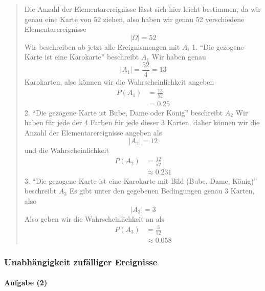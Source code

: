 \documentclass[
]{article}
\begin{document}
\begin{quote}
Die Anzahl der Elementarereignisse lässt sich hier leicht bestimmen, da
wir genau eine Karte von 52 ziehen, also haben wir genau 52 verschiedene
Elementarereignisse \[\lvert \Omega \rvert = 52 \] Wir beschreiben ab
jetzt alle Ereignismengen mit \(A_i\) 1. ``Die gezogene Karte ist eine
Karokarte'' beschreibt \(A_1\) Wir haben genau
\[\lvert A_{1} \rvert = \frac{52}{4} = 13\] Karokarten, also können wir
die Wahrscheinlichkeit angeben \[\begin{align}
P(A_{1}) &= \frac{13}{52}  \\
&= 0.25
\end{align}\] 2. ``Die gezogene Karte ist Bube, Dame oder König''
beschreibt \(A_2\) Wir haben für jede der 4 Farben für jede dieser 3
Karten, daher können wir die Anzahl der Elementarereignisse angeben als
\[\lvert A_{2} \rvert  = 12\] und die Wahrscheinlichkeit \[\begin{align}
P(A_{2}) &= \frac{12}{52}  \\
&\approx 0.231
\end{align}\] 3. ``Die gezogene Karte ist eine Karokarte mit Bild (Bube,
Dame, König)'' beschreibt \(A_{3}\) Es gibt unter den gegebenen
Bedingungen genau 3 Karten, also \[\lvert A_{3} \rvert = 3 \] Also geben
wir die Wahrscheinlichkeit an als \[\begin{align}
P(A_{3}) &= \frac{3}{52} \\
     &\approx 0.058
\end{align}\]
\end{quote}

\subsubsection{Unabhängigkeit zufälliger
Ereignisse}\label{unabhuxe4ngigkeit-zufuxe4lliger-ereignisse}

\paragraph{Aufgabe (2)}\label{aufgabe-2}
\end{document}

